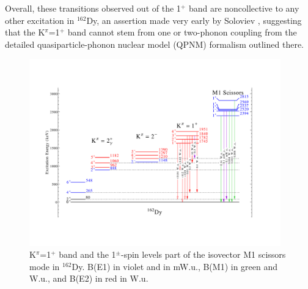Overall, these transitions observed out of the 1$^+$ band are noncollective to any other excitation in $^{162}$Dy, an assertion made very early by Soloviev \cite{Solovev_162K2octupole}, suggesting that the K$^\pi$=1$^+$ band cannot stem from one or two-phonon coupling from the detailed quasiparticle-phonon nuclear model (QPNM) formalism outlined there.  

\begin{figure}[h!]
\begin{center}
\includegraphics[width=0.97\textwidth]{figures/162Dy_scissors.pdf}
\end{center}
\caption{K$^\pi$=1$^+$ band and the 1$^\pm$-spin levels part of the isovector M1 scissors mode in $^{162}$Dy. B(E1) in violet and in mW.u., B(M1) in green and W.u., and B(E2) in red in W.u. \label{fig:162Dy_scissors}}
\end{figure}
